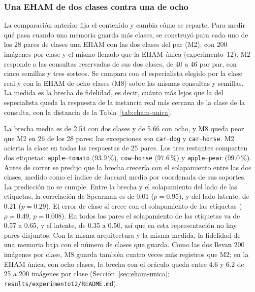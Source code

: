 \subsubsection{Una EHAM de dos clases contra una de ocho}
\label{sec:fase3-dos-clases}

La comparación anterior fija el contenido y cambia cómo se reparte.
Para medir qué pasa cuando una memoria guarda más clases, se construyó para cada uno de
los 28 pares de clases una EHAM con las dos clases del par (M2), con 200 imágenes por
clase y el mismo llenado que la EHAM única (experimento~12).
M2 responde a las consultas reservadas de sus dos clases, de 40 a 46 por par, con cinco
semillas y tres sorteos.
Se compara con el especialista elegido por la clase real y con la EHAM de ocho clases
(M8) sobre las mismas consultas y semillas.
La medida es la brecha de fidelidad, es decir, cuánto más lejos que la del especialista
queda la respuesta de la instancia real más cercana de la clase de la consulta, con la
distancia de la Tabla~\ref{tab:eham-unica}.

La brecha media es de 2.54 con dos clases y de 5.66 con ocho, y M8 queda peor que M2 en
26 de los 28 pares; las excepciones son \texttt{car}--\texttt{dog} y
\texttt{car}--\texttt{horse}.
M2 acierta la clase en todas las respuestas de 25 pares.
Los tres restantes comparten dos etiquetas: \texttt{apple}--\texttt{tomato} (93.9\,\%),
\texttt{cow}--\texttt{horse} (97.6\,\%) y \texttt{apple}--\texttt{pear} (99.0\,\%).
Antes de correr se predijo que la brecha crecería con el solapamiento entre las dos
clases, medido como el índice de Jaccard medio por coordenada de sus soportes.
La predicción no se cumple.
Entre la brecha y el solapamiento del lado de las etiquetas, la correlación de Spearman
es de 0.01 ($p = 0.95$), y del lado latente, de 0.21 ($p = 0.29$).
El error de clase sí crece con el solapamiento de las etiquetas ($\rho = 0.49$,
$p = 0.008$).
En todos los pares el solapamiento de las etiquetas va de 0.57 a 0.65, y el latente, de
0.35 a 0.50, así que en esta representación no hay pares disjuntos.
Con la misma arquitectura y la misma medida, la fidelidad de una memoria baja con el
número de clases que guarda.
Como las dos llevan 200 imágenes por clase, M8 guarda también cuatro veces más registros
que M2; en la EHAM única, con ocho clases, la brecha con el oráculo queda entre 4.6 y 6.2
de 25 a 200 imágenes por clase (Sección~\ref{sec:eham-unica};
\texttt{results/experimento12/README.md}).

